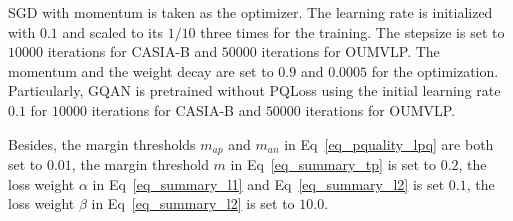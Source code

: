 SGD with momentum is taken as the optimizer.
%
The learning rate is initialized with $0.1$ and scaled to its $1/10$ three times for the training.
%
The stepsize is set to $10000$ iterations for CASIA-B and $50000$ iterations for OUMVLP.
%
The momentum and the weight decay are set to $0.9$ and $0.0005$ for the optimization.
%
Particularly, GQAN is pretrained without PQLoss using the initial learning rate $0.1$ for $10000$ iterations for CASIA-B and $50000$ iterations for OUMVLP.

Besides, the margin thresholds $m_{ap}$ and $m_{an}$ in Eq~\eqref{eq_pquality_lpq} are both set to $0.01$,
%
the margin threshold $m$ in Eq~\eqref{eq_summary_tp} is set to $0.2$,
%
the loss weight $\alpha$ in Eq~\eqref{eq_summary_l1} and Eq~\eqref{eq_summary_l2} is set $0.1$,
%
the loss weight $\beta$ in Eq~\eqref{eq_summary_l2} is set to $10.0$.


